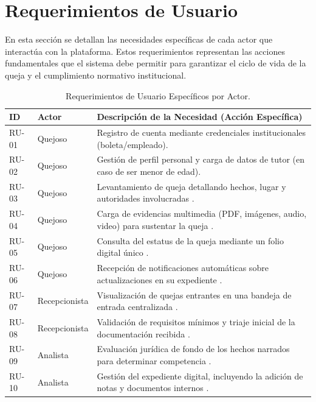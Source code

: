 \section{Requerimientos de Usuario}

En esta sección se detallan las necesidades específicas de cada actor que interactúa con la plataforma. Estos requerimientos representan las acciones fundamentales que el sistema debe permitir para garantizar el ciclo de vida de la queja y el cumplimiento normativo institucional.

\begin{table}[h!]
\centering
\caption{Requerimientos de Usuario Específicos por Actor.}
\label{tab:user_req_detallado}
\begin{tabular}{@{} l l p{8.5cm} @{}}
\toprule
\rowcolor[HTML]{2D3E50} 
\textbf{\color[HTML]{FFFFFF} ID} & \textbf{\color[HTML]{FFFFFF} Actor} & \textbf{\color[HTML]{FFFFFF} Descripción de la Necesidad (Acción Específica)} \\ \midrule

\rowcolor[HTML]{F2F4F7} 
RU-01 & Quejoso & Registro de cuenta mediante credenciales institucionales (boleta/empleado). \\
RU-02 & Quejoso & Gestión de perfil personal y carga de datos de tutor (en caso de ser menor de edad). \\
\rowcolor[HTML]{F2F4F7} 
RU-03 & Quejoso & Levantamiento de queja detallando hechos, lugar y autoridades involucradas . \\
RU-04 & Quejoso & Carga de evidencias multimedia (PDF, imágenes, audio, video) para sustentar la queja . \\
\rowcolor[HTML]{F2F4F7} 
RU-05 & Quejoso & Consulta del estatus de la queja mediante un folio digital único . \\
RU-06 & Quejoso & Recepción de notificaciones automáticas sobre actualizaciones en su expediente . \\ \midrule

\rowcolor[HTML]{F2F4F7} 
RU-07 & Recepcionista & Visualización de quejas entrantes en una bandeja de entrada centralizada . \\
RU-08 & Recepcionista & Validación de requisitos mínimos y triaje inicial de la documentación recibida . \\ \midrule

\rowcolor[HTML]{F2F4F7} 
RU-09 & Analista & Evaluación jurídica de fondo de los hechos narrados para determinar competencia . \\
RU-10 & Analista & Gestión del expediente digital, incluyendo la adición de notas y documentos internos . \\ \midrule


\end{tabular}
\end{table}
